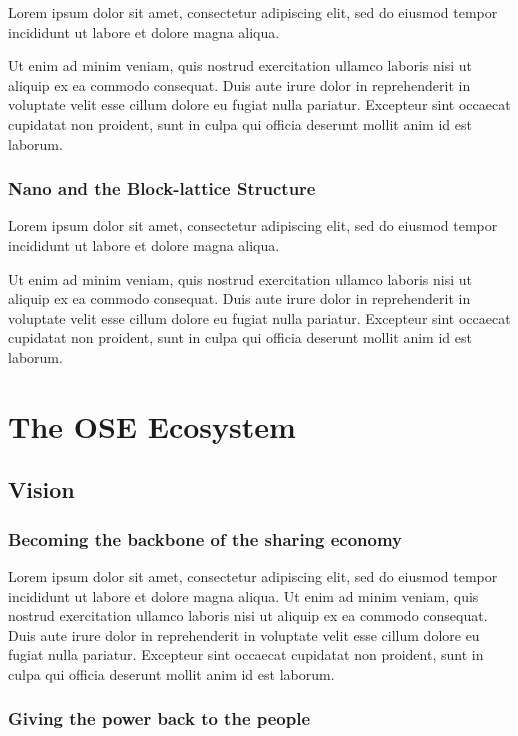 \documentclass[a4paper]{article}
\begin{document}
Lorem ipsum dolor sit amet, consectetur adipiscing elit, sed do eiusmod tempor incididunt ut labore et dolore magna aliqua.

Ut enim ad minim veniam, quis nostrud exercitation ullamco laboris nisi ut aliquip ex ea commodo consequat. Duis aute irure dolor in reprehenderit in voluptate velit esse cillum dolore eu fugiat nulla pariatur. Excepteur sint occaecat cupidatat non proident, sunt in culpa qui officia deserunt mollit anim id est laborum.

\subsubsection{Nano and the Block-lattice Structure}

Lorem ipsum dolor sit amet, consectetur adipiscing elit, sed do eiusmod tempor incididunt ut labore et dolore magna aliqua.

Ut enim ad minim veniam, quis nostrud exercitation ullamco laboris nisi ut aliquip ex ea commodo consequat. Duis aute irure dolor in reprehenderit in voluptate velit esse cillum dolore eu fugiat nulla pariatur. Excepteur sint occaecat cupidatat non proident, sunt in culpa qui officia deserunt mollit anim id est laborum.

\newpage

\section{The OSE Ecosystem}

\subsection{Vision}

\subsubsection{Becoming the backbone of the sharing economy}

Lorem ipsum dolor sit amet, consectetur adipiscing elit, sed do eiusmod tempor incididunt ut labore et dolore magna aliqua. Ut enim ad minim veniam, quis nostrud exercitation ullamco laboris nisi ut aliquip ex ea commodo consequat. Duis aute irure dolor in reprehenderit in voluptate velit esse cillum dolore eu fugiat nulla pariatur. Excepteur sint occaecat cupidatat non proident, sunt in culpa qui officia deserunt mollit anim id est laborum.

\subsubsection{Giving the power back to the people}
\end{document}

